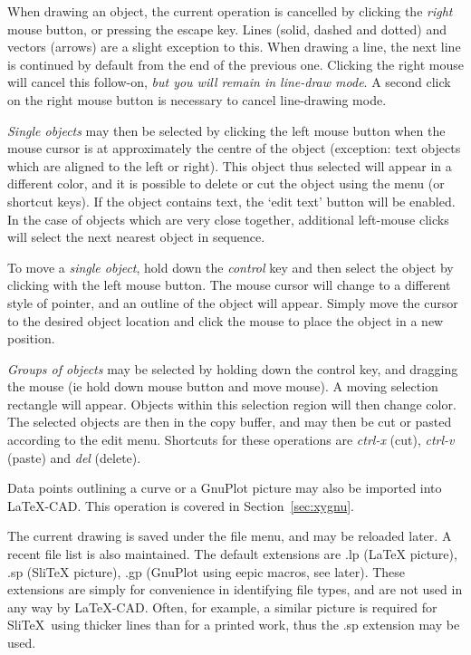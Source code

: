 \documentclass[a4paper]{article}
\begin{document}
When drawing an object, the current operation is cancelled by clicking
the \textit{right} mouse button, or pressing the escape key. Lines (solid,
dashed and dotted) and vectors (arrows) are a slight exception to this.
When drawing a line, the next line is continued by default from the
end of the previous one. Clicking the right mouse will cancel this follow-on,
\textit{but you will remain in line-draw mode}. A second click on the right mouse
button is necessary to cancel line-drawing mode. 

\textit{Single objects} may then be selected by clicking the left mouse button when
the mouse cursor is at approximately the centre of the object (exception:
text objects which are aligned to the left or right).
This object thus selected will appear in a different color, and it is
possible to delete or cut the object using the menu (or shortcut keys).
If the object contains text, the `edit text' button will be enabled.
In the case of objects which are very close together, additional left-mouse
clicks will select the next nearest object in sequence.

To move a \textit{single object}, hold down the \textit{control} key and then
select the object by clicking with the left mouse button. The mouse
cursor will change to a different style of pointer, and an outline of the
object will appear. Simply move the cursor to the desired object location
and click the mouse to place the object in a new position.

\textit{Groups of objects} may be selected by holding down the control key, and
dragging the mouse (ie hold down mouse button and move mouse). A moving
selection rectangle will appear. Objects within this selection region will
then change color.
The selected objects are then in the copy buffer, and may then be cut or
pasted according to the edit menu. Shortcuts for these operations are
\textit{ctrl-x} (cut), \textit{ctrl-v} (paste) and \textit{del} (delete).

Data points outlining a curve or a GnuPlot picture may also be
imported into LaTeX-CAD. This operation is covered in
Section~\ref{sec:xygnu}.

The current drawing is saved under the file menu, and may be reloaded
later. A recent file list is also maintained. The default extensions
are .lp (\LaTeX\/ picture), .sp (Sli\TeX\/ picture), .gp (GnuPlot using
eepic macros, see later). These extensions are simply for convenience
in identifying file types, and are not used in any way by LaTeX-CAD.
Often, for example, a similar picture is required for Sli\TeX\ using
thicker lines than for a printed work, thus the .sp extension may
be used.
\end{document}
